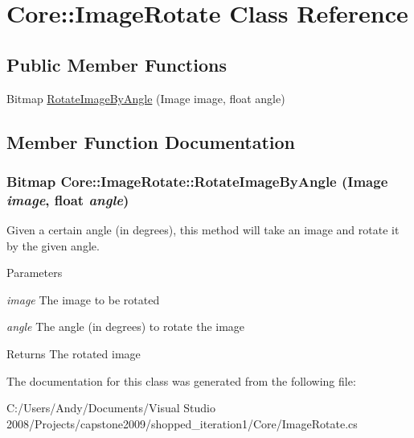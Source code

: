 \hypertarget{class_core_1_1_image_rotate}{
\section{Core::ImageRotate Class Reference}
\label{class_core_1_1_image_rotate}
}
\subsection*{Public Member Functions}
\begin{DoxyCompactItemize}
\item 
Bitmap \hyperlink{class_core_1_1_image_rotate_af7ef045ae759e1b41ed69d95c67299d5}{RotateImageByAngle} (Image image, float angle)
\end{DoxyCompactItemize}


\subsection{Member Function Documentation}
\hypertarget{class_core_1_1_image_rotate_af7ef045ae759e1b41ed69d95c67299d5}{
\subsubsection[{RotateImageByAngle}]{\setlength{\rightskip}{0pt plus 5cm}Bitmap Core::ImageRotate::RotateImageByAngle (Image {\em image}, \/  float {\em angle})}}
\label{class_core_1_1_image_rotate_af7ef045ae759e1b41ed69d95c67299d5}
Given a certain angle (in degrees), this method will take an image and rotate it by the given angle.


\begin{DoxyParams}{Parameters}
\item[{\em image}]The image to be rotated \item[{\em angle}]The angle (in degrees) to rotate the image \end{DoxyParams}
\begin{DoxyReturn}{Returns}
The rotated image 
\end{DoxyReturn}


The documentation for this class was generated from the following file:\begin{DoxyCompactItemize}
\item 
C:/Users/Andy/Documents/Visual Studio 2008/Projects/capstone2009/shopped\_\-iteration1/Core/ImageRotate.cs\end{DoxyCompactItemize}
